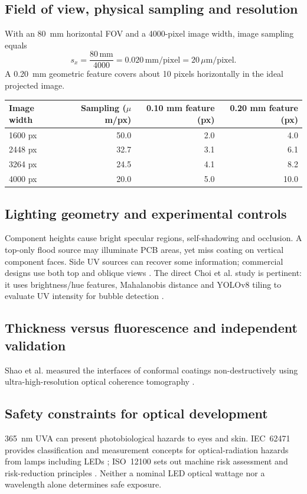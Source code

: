 \subsection{Field of view, physical sampling and resolution}
With an 80~mm horizontal FOV and a 4000-pixel image width, image sampling equals
\begin{equation}
s_x=\frac{80\,\mathrm{mm}}{4000}=0.020\,\mathrm{mm/pixel}=20\,\mu\mathrm{m/pixel}.
\end{equation}
A 0.20~mm geometric feature covers about 10 pixels horizontally in the ideal projected image.

\begin{table}[htbp]\centering\small
\begin{tabular}{lrrr}\toprule
Image width & Sampling ($\mu$m/px) & 0.10 mm feature (px) & 0.20 mm feature (px) \\\midrule
1600 px & 50.0 & 2.0 & 4.0\\
2448 px & 32.7 & 3.1 & 6.1\\
3264 px & 24.5 & 4.1 & 8.2\\
4000 px & 20.0 & 5.0 & 10.0\\
\bottomrule\end{tabular}
\end{table}

\subsection{Lighting geometry and experimental controls}
Component heights cause bright specular regions, self-shadowing and occlusion. A top-only flood source may illuminate PCB areas, yet miss coating on vertical component faces. Side UV sources can recover some information; commercial designs use both top and oblique views \citep{goepelcci,mirteccci}. The direct Choi et al. study is pertinent: it uses brightness/hue features, Mahalanobis distance and YOLOv8 tiling to evaluate UV intensity for bubble detection \citep{choi2024uv}.

\subsection{Thickness versus fluorescence and independent validation}
Shao et al. measured the interfaces of conformal coatings non-destructively using ultra-high-resolution optical coherence tomography \citep{shao2019oct}.

\subsection{Safety constraints for optical development}
365~nm UVA can present photobiological hazards to eyes and skin. IEC~62471 provides classification and measurement concepts for optical-radiation hazards from lamps including LEDs \citep{iec62471}; ISO~12100 sets out machine risk assessment and risk-reduction principles \citep{iso12100}. Neither a nominal LED optical wattage nor a wavelength alone determines safe exposure.
